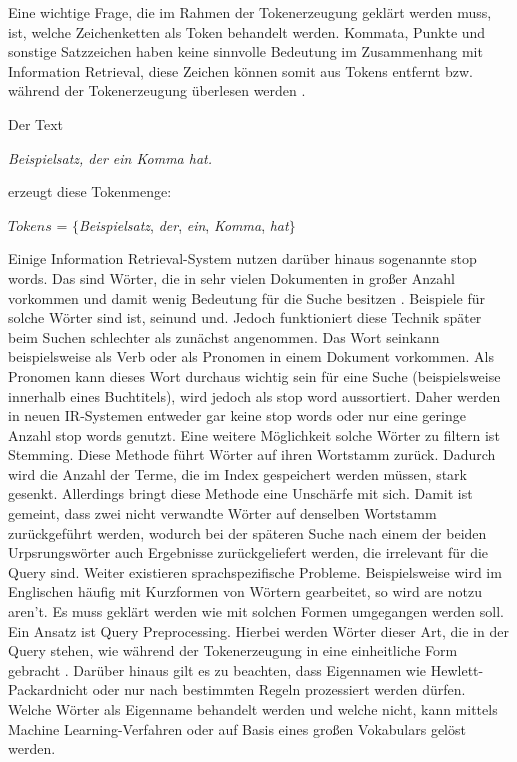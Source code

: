 Eine wichtige Frage, die im Rahmen der Tokenerzeugung geklärt werden muss, ist, welche Zeichenketten als Token behandelt werden. Kommata, Punkte und sonstige Satzzeichen haben keine sinnvolle Bedeutung im Zusammenhang mit Information Retrieval, diese Zeichen können somit aus Tokens entfernt bzw. während der Tokenerzeugung überlesen werden \cite{IR_Intro_Cambridge}.

Der Text
\begin{center}
	\textit{Beispielsatz, der ein Komma hat.}
\end{center}
erzeugt diese Tokenmenge:
\begin{center}
	$Tokens$ = $\{$\textit{Beispielsatz}, \textit{der}, \textit{ein}, \textit{Komma}, \textit{hat}$\}$
\end{center}

Einige Information Retrieval-System nutzen darüber hinaus sogenannte \glqq stop words\grqq. Das sind Wörter, die in sehr vielen Dokumenten in großer Anzahl vorkommen und damit wenig Bedeutung für die Suche besitzen \cite{IR_Intro_Cambridge}. Beispiele für solche Wörter sind \glqq ist\grqq, \glqq sein\grqq und \glqq und\grqq. Jedoch funktioniert diese Technik später beim Suchen schlechter als zunächst angenommen. Das Wort \glqq sein\grqq kann beispielsweise als Verb oder als Pronomen in einem Dokument vorkommen. Als Pronomen kann dieses Wort durchaus wichtig sein für eine Suche (beispielsweise innerhalb eines Buchtitels), wird jedoch als stop word aussortiert. Daher werden in neuen IR-Systemen entweder gar keine stop words oder nur eine geringe Anzahl stop words genutzt.
\newline
Eine weitere Möglichkeit solche Wörter zu filtern ist Stemming.
Diese Methode führt Wörter auf ihren Wortstamm zurück. Dadurch wird die Anzahl der Terme, die im Index gespeichert werden müssen, stark gesenkt. Allerdings bringt diese Methode eine Unschärfe mit sich. Damit ist gemeint, dass zwei nicht verwandte Wörter auf denselben Wortstamm zurückgeführt werden, wodurch bei der späteren Suche nach einem der beiden Urpsrungswörter auch Ergebnisse zurückgeliefert werden, die irrelevant für die Query sind.
\newpage
Weiter existieren sprachspezifische Probleme. Beispielsweise wird im Englischen häufig mit Kurzformen von Wörtern gearbeitet, so wird \glqq are not\grqq zu \glqq aren't\grqq. Es muss geklärt werden wie mit solchen Formen umgegangen werden soll. Ein Ansatz ist Query Preprocessing. Hierbei werden Wörter dieser Art, die in der Query stehen, wie während der Tokenerzeugung in eine einheitliche Form gebracht \cite{IR_Intro_Cambridge}. Darüber hinaus gilt es zu beachten, dass Eigennamen wie \glqq Hewlett-Packard\grqq nicht oder nur nach bestimmten Regeln prozessiert werden dürfen. Welche Wörter als Eigenname behandelt werden und welche nicht, kann mittels Machine Learning-Verfahren oder auf Basis eines großen Vokabulars gelöst werden.
\newline

